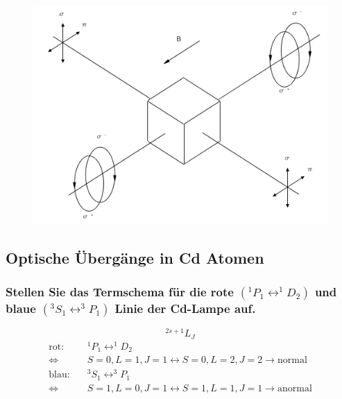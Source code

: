 \begin{figure}[H] %
    \centering
    \includegraphics[scale=0.4]{pictures/Polarisation.png}
\end{figure}


\subsection{Optische Übergänge in Cd Atomen}

\subsubsection[]{Stellen Sie das Termschema für die rote $(^1P_1 \leftrightarrow ^1D_2)$ und blaue 
$(^3S_1 \leftrightarrow ^3P_1)$ Linie der Cd-Lampe auf.}
\begin{equation*}
    ^{2s+1}L_J
\end{equation*}
\begin{align*}
    \text{rot: } \quad&^1P_1 \leftrightarrow ^1D_2 \\\iff &S=0, L=1, J=1\leftrightarrow S=0, L=2, J=2 \to\text{normal}\\
    \text{blau:} \quad&^3S_1 \leftrightarrow ^3P_1 \\\iff &S=1, L=0, J=1\leftrightarrow S=1, L=1, J=1 \to\text{anormal}   
\end{align*}

